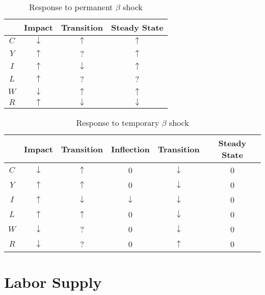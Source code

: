 \documentclass[11pt]{amsart}
\begin{document}
\begin{table}[htp]
\caption{Response to permanent $\beta$ shock}
\begin{center}
\begin{tabular}{c|c|c|c|}
& Impact & Transition & Steady State \\ \hline
$C$ & $\downarrow$ & $\uparrow$ & $\uparrow$ \\
$Y$ & $\uparrow$ & ? & $\uparrow$ \\
$I$ & $\uparrow$ & $\downarrow$ & $\uparrow$ \\
$L$ & $\uparrow$ & ? & ? \\
$W$ & $\downarrow$ & $\uparrow$ & $\uparrow$ \\
$R$ & $\uparrow$ & $\downarrow$ & $\downarrow$ \\
\end{tabular}
\end{center}
\label{default}
\end{table}

\begin{table}[htp]
\caption{Response to temporary $\beta$ shock}
\begin{center}
\begin{tabular}{c|c|c|c|c|c}
& Impact & Transition & Inflection & Transition & Steady State \\ \hline
$C$ & $\downarrow$ & $\uparrow$ & 0 & $\downarrow$ & 0\\
$Y$ & $\uparrow$ & $\uparrow$ & 0 & $\downarrow$ & 0\\
$I$ & $\uparrow$ & $\downarrow$ & $\downarrow$ & $\downarrow$ & 0\\
$L$ & $\uparrow$ & $\uparrow$  & 0 & $\downarrow$ & 0  \\
$W$ & $\downarrow$ & ? & 0 & $\downarrow$ & 0\\
$R$ & $\downarrow$ & ? & 0 & $\uparrow$ & 0 \\
\end{tabular}
\end{center}
\label{default}
\end{table}


\section{Labor Supply}
\end{document}
